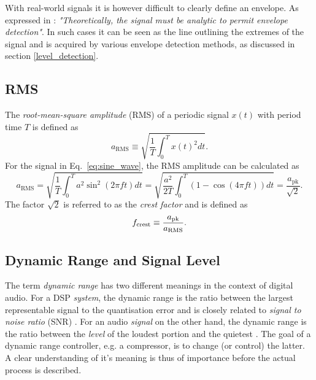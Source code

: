 \documentclass[../main2.tex]{subfiles}
\begin{document}
With real-world signals it is however difficult to clearly define an envelope. As expressed in \cite{bedrosian1962analytic}: \emph{"Theoretically, the signal must be analytic to permit envelope detection"}. In such cases it can be seen as the line outlining the extremes of the signal and is acquired by various envelope detection methods, as discussed in section \ref{level_detection}. 
\subsection{RMS}
The \emph{root-mean-square amplitude} (RMS) of a periodic signal $x(t)$ with period time $T$ is defined as
\begin{equation}
a_\text{RMS} \equiv \sqrt{ \frac{1}{T} \int_{0}^{T} x(t)^2 dt }.
\end{equation}
For the signal in Eq.~\eqref{eq:sine_wave}, the RMS amplitude can be calculated as
\begin{equation}\label{eq:a_RMS}
a_\text{RMS} =
\sqrt{ \frac{1}{T} \int_{0}^{T} a^2 \sin^2 (2 \pi f t) dt } =
\sqrt{ \frac{a^2}{2T} \int_{0}^{T}\left( 1 - \cos (4 \pi f t) \right) dt } =
\frac{a_\text{pk}}{\sqrt 2}.
\end{equation}
The factor $\sqrt 2$ is referred to as the \emph{crest factor} and is defined as
\begin{align}
f_\text{crest} \equiv \frac{a_\text{pk}}{a_\text{RMS}}. \label{eq:crest_factor}
\end{align}

\subsection{Dynamic Range and Signal Level}\label{theory_dynamic_range}
The term \emph{dynamic range} has two different meanings in the context of digital audio. For a DSP \emph{system}, the dynamic range is the ratio between the largest representable signal to the quantisation error and is closely related to \emph{signal to noise ratio} (SNR)  \cite{wilson1993filter}. For an audio \emph{signal} on the other hand, the dynamic range is the ratio between the \emph{level} of the loudest portion and the quietest \cite{davis1989sound}. The goal of a dynamic range controller, e.g. a compressor, is to change (or control) the latter. A clear understanding of it's meaning is thus of importance before the actual process is described. 
\end{document}
